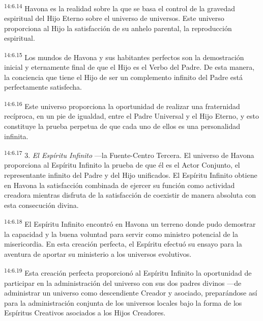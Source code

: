 \par
\textsuperscript{14:6.14} Havona es la realidad sobre la que se basa el control de la gravedad espiritual del Hijo Eterno sobre el universo de universos. Este universo proporciona al Hijo la satisfacción de su anhelo parental, la reproducción espiritual.

\par
\textsuperscript{14:6.15} Los mundos de Havona y sus habitantes perfectos son la demostración inicial y eternamente final de que el Hijo es el Verbo del Padre. De esta manera, la conciencia que tiene el Hijo de ser un complemento infinito del Padre está perfectamente satisfecha.

\par
\textsuperscript{14:6.16} Este universo proporciona la oportunidad de realizar una fraternidad recíproca, en un pie de igualdad, entre el Padre Universal y el Hijo Eterno, y esto constituye la prueba perpetua de que cada uno de ellos es una personalidad infinita.

\par
\textsuperscript{14:6.17} 3. \textit{El Espíritu Infinito} ---la Fuente-Centro Tercera. El universo de Havona proporciona al Espíritu Infinito la prueba de que él es el Actor Conjunto, el representante infinito del Padre y del Hijo unificados. El Espíritu Infinito obtiene en Havona la satisfacción combinada de ejercer su función como actividad creadora mientras disfruta de la satisfacción de coexistir de manera absoluta con esta consecución divina.

\par
\textsuperscript{14:6.18} El Espíritu Infinito encontró en Havona un terreno donde pudo demostrar la capacidad y la buena voluntad para servir como ministro potencial de la misericordia. En esta creación perfecta, el Espíritu efectuó su ensayo para la aventura de aportar su ministerio a los universos evolutivos.

\par
\textsuperscript{14:6.19} Esta creación perfecta proporcionó al Espíritu Infinito la oportunidad de participar en la administración del universo con sus dos padres divinos ---de administrar un universo como descendiente Creador y asociado, preparándose así para la administración conjunta de los universos locales bajo la forma de los Espíritus Creativos asociados a los Hijos Creadores.

